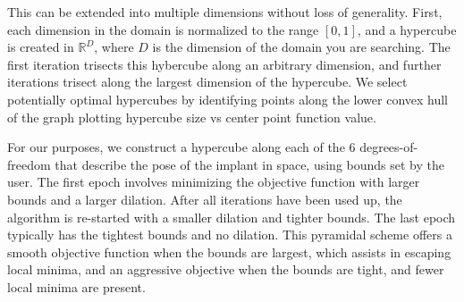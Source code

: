 This can be extended into multiple dimensions without loss of generality. First, each dimension in the domain is normalized to the range $[0,1]$, and a hypercube is created in $\mathbb{R}^D$, where $D$ is the dimension of the domain you are searching. The first iteration trisects this hybercube along an arbitrary dimension, and further iterations trisect along the largest dimension of the hypercube. We select potentially optimal hypercubes by identifying points along the lower convex hull of the graph plotting hypercube size vs center point function value.


For our purposes, we construct a hypercube along each of the 6 degrees-of-freedom that describe the pose of the implant in space, using bounds set by the user. The first epoch involves minimizing the objective function with larger bounds and a larger dilation. After all iterations have been used up, the algorithm is re-started with a smaller dilation and tighter bounds. The last epoch typically has the tightest bounds and no dilation. This pyramidal scheme offers a smooth objective function when the bounds are largest, which assists in escaping local minima, and an aggressive objective when the bounds are tight, and fewer local minima are present.